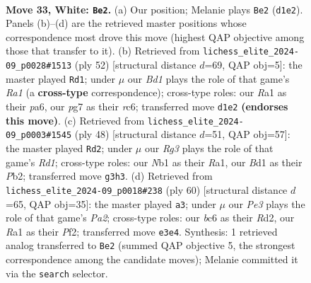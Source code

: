 \documentclass[11pt]{article}
\begin{document}
\clearpage

\begin{figure}[p]\centering
\begin{subfigure}{0.46\textwidth}\centering
\resizebox{\linewidth}{!}{%
\newchessgame
\chessboard[
  setfen={r5k1/4rppp/nnbN4/p3p1P1/8/1P2P1R1/P5PP/RN1B3K w - - 4 33},
  showmover=false,
  pgfstyle=straightmove, color=movearrow, markmove={d1-e2}
]}
\caption{}
\end{subfigure}\hfill
\begin{subfigure}{0.46\textwidth}\centering
\resizebox{\linewidth}{!}{%
\newchessgame
\chessboard[
  setfen={2r1kb2/1p2p3/p1r5/2n1PN1p/2R2P2/2P1B2P/PP3P2/R4K2 w - - 5 27},
  showmover=false,
  pgfstyle=straightmove, color=movearrow, markmove={a1-d1}
]}
\caption{}
\end{subfigure}
\\[4pt]
\begin{subfigure}{0.46\textwidth}\centering
\resizebox{\linewidth}{!}{%
\newchessgame
\chessboard[
  setfen={r5k1/p2rnpb1/1p6/1Np1p3/P3P1P1/2PP4/1P3PP1/R2R2K1 w - - 0 25},
  showmover=false,
  pgfstyle=straightmove, color=movearrow, markmove={d1-d2}
]}
\caption{}
\end{subfigure}\hfill
\begin{subfigure}{0.46\textwidth}\centering
\resizebox{\linewidth}{!}{%
\newchessgame
\chessboard[
  setfen={1r1r4/p3n1pp/4kp2/NbPpp3/1P6/2P3P1/P2R1PBP/3R2K1 w - - 3 31},
  showmover=false,
  pgfstyle=straightmove, color=movearrow, markmove={a2-a3}
]}
\caption{}
\end{subfigure}
\caption{\textbf{Move 33, White: \texttt{Be2}.} (a) Our position; Melanie plays \texttt{Be2} (\texttt{d1e2}). Panels (b)--(d) are the retrieved master positions whose correspondence most drove this move (highest QAP objective among those that transfer to it). (b) Retrieved from \texttt{lichess\_elite\_2024-09\_p0028\#1513} (ply 52) [structural distance $d$=69, QAP obj=5]: the master played \texttt{Rd1}; under $\mu$ our \emph{Bd1} plays the role of that game's \emph{Ra1} (a \textbf{cross-type} correspondence); cross-type roles: our \emph{R}a1 as their \emph{p}a6, our \emph{p}g7 as their \emph{r}c6; transferred move \texttt{d1e2} \textbf{(endorses this move)}. (c) Retrieved from \texttt{lichess\_elite\_2024-09\_p0003\#1545} (ply 48) [structural distance $d$=51, QAP obj=57]: the master played \texttt{Rd2}; under $\mu$ our \emph{Rg3} plays the role of that game's \emph{Rd1}; cross-type roles: our \emph{N}b1 as their \emph{R}a1, our \emph{B}d1 as their \emph{P}b2; transferred move \texttt{g3h3}. (d) Retrieved from \texttt{lichess\_elite\_2024-09\_p0018\#238} (ply 60) [structural distance $d$=65, QAP obj=35]: the master played \texttt{a3}; under $\mu$ our \emph{Pe3} plays the role of that game's \emph{Pa2}; cross-type roles: our \emph{b}c6 as their \emph{R}d2, our \emph{R}a1 as their \emph{P}f2; transferred move \texttt{e3e4}. Synthesis: 1 retrieved analog transferred to \texttt{Be2} (summed QAP objective 5, the strongest correspondence among the candidate moves); Melanie committed it via the \texttt{search} selector.}
\label{fig:thought-m64}
\end{figure}
\end{document}
